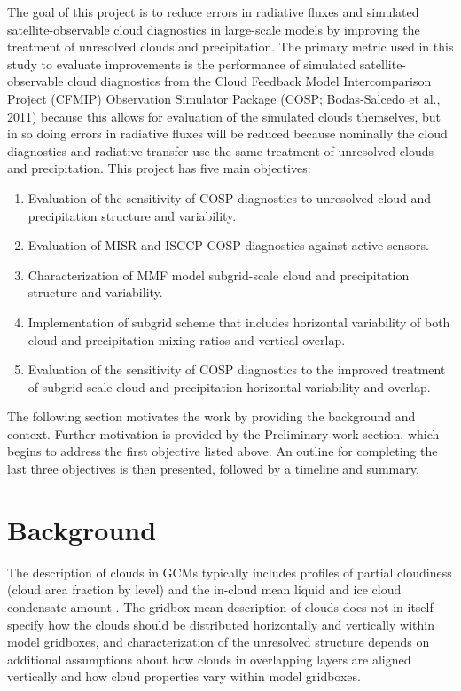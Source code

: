 \documentclass[letter]{article}
\begin{document}
The goal of this project is to reduce errors in radiative fluxes and simulated satellite-observable cloud diagnostics in large-scale models by improving the treatment of unresolved clouds and precipitation. The primary metric used in this study to evaluate improvements is the performance of simulated satellite-observable cloud diagnostics from the Cloud Feedback Model Intercomparison Project (CFMIP) Observation Simulator Package (COSP; Bodas-Salcedo et al., 2011) because this allows for evaluation of the simulated clouds themselves, but in so doing errors in radiative fluxes will be reduced because nominally the cloud diagnostics and radiative transfer use the same treatment of unresolved clouds and precipitation. 
This project has five main objectives:
\begin{enumerate}
    \item Evaluation of the sensitivity of COSP diagnostics to unresolved cloud and precipitation structure and variability.
    \item Evaluation of MISR and ISCCP COSP diagnostics against active sensors.
    \item Characterization of  MMF model subgrid-scale cloud and precipitation structure and variability.
    \item Implementation of subgrid scheme that includes horizontal variability of both cloud and precipitation mixing ratios and vertical overlap.
    \item Evaluation of the sensitivity of COSP diagnostics to the improved treatment of subgrid-scale cloud and precipitation horizontal variability and overlap.
\end{enumerate}

The following section motivates the work by providing the background and context. Further motivation is provided by the Preliminary work section, which begins to address the first objective listed above. An outline for completing the last three objectives is then presented, followed by a timeline and summary.

\section{Background}
The description of clouds in GCMs typically includes profiles of partial cloudiness (cloud area fraction by level) and the in-cloud mean liquid and ice cloud condensate amount \citep[e.g.,][]{cam3_description,cam4_description}. The gridbox mean description of clouds does not in itself specify how the clouds should be distributed horizontally and vertically within model gridboxes, and characterization of the unresolved structure depends on additional assumptions about how clouds in overlapping layers are aligned vertically and how cloud properties vary within model gridboxes.
\end{document}
